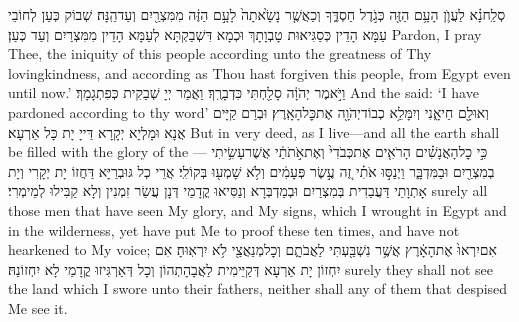 {סְלַֽח\maqqaf נָ֗א לַעֲוֺ֛ן הָעָ֥ם הַזֶּ֖ה כְּגֹ֣דֶל חַסְדֶּ֑ךָ וְכַאֲשֶׁ֤ר נָשָׂ֙אתָה֙ לָעָ֣ם הַזֶּ֔ה מִמִּצְרַ֖יִם וְעַד\maqqaf הֵֽנָּה׃}
{שְׁבוֹק כְּעַן לְחוֹבֵי עַמָּא הָדֵין כְּסַגִּיאוּת טָבְוָתָךְ וּכְמָא דִּשְׁבַקְתָּא לְעַמָּא הָדֵין מִמִּצְרַיִם וְעַד כְּעַן׃}
{Pardon, I pray Thee, the iniquity of this people according unto the greatness of Thy lovingkindness, and according as Thou hast forgiven this people, from Egypt even until now.’}{}
{וַיֹּ֣אמֶר יְהֹוָ֔ה סָלַ֖חְתִּי כִּדְבָרֶֽךָ׃}
{וַאֲמַר יְיָ שְׁבַקִית כְּפִתְגָמָךְ׃}
{And the \lord\space said: ‘I have pardoned according to thy word’}{}
{וְאוּלָ֖ם חַי\maqqaf אָ֑נִי וְיִמָּלֵ֥א כְבוֹד\maqqaf יְהֹוָ֖ה אֶת\maqqaf כׇּל\maqqaf הָאָֽרֶץ׃}
{וּבְרַם קַיָּים אֲנָא וּמָלְיָא יְקָרָא דַּייָ יָת כָּל אַרְעָא׃}
{But in very deed, as I live—and all the earth shall be filled with the glory of the \lord—}{}
{כִּ֣י כׇל\maqqaf הָאֲנָשִׁ֗ים הָרֹאִ֤ים אֶת\maqqaf כְּבֹדִי֙ וְאֶת\maqqaf אֹ֣תֹתַ֔י אֲשֶׁר\maqqaf עָשִׂ֥יתִי בְמִצְרַ֖יִם וּבַמִּדְבָּ֑ר וַיְנַסּ֣וּ אֹתִ֗י זֶ֚ה עֶ֣שֶׂר פְּעָמִ֔ים וְלֹ֥א שָׁמְע֖וּ בְּקוֹלִֽי׃}
{אֲרֵי כְל גּוּבְרַיָּא דַּחֲזוֹ יָת יְקָרִי וְיָת אָתְוָתַי דַּעֲבַדִית בְּמִצְרַיִם וּבְמַדְבְּרָא וְנַסִּיאוּ קֳדָמַי דְּנָן עֲשַׂר זִמְנִין וְלָא קַבִּילוּ לְמֵימְרִי׃}
{surely all those men that have seen My glory, and My signs, which I wrought in Egypt and in the wilderness, yet have put Me to proof these ten times, and have not hearkened to My voice;}{}
{אִם\maqqaf יִרְאוּ֙ אֶת\maqqaf הָאָ֔רֶץ אֲשֶׁ֥ר נִשְׁבַּ֖עְתִּי לַאֲבֹתָ֑ם וְכׇל\maqqaf מְנַאֲצַ֖י לֹ֥א יִרְאֽוּהָ׃}
{אִם יִחְזוֹן יָת אַרְעָא דְּקַיֵּימִית לַאֲבָהָתְהוֹן וְכָל דְּאַרְגִּיזוּ קֳדָמַי לָא יִחְזוֹנַהּ׃}
{surely they shall not see the land which I swore unto their fathers, neither shall any of them that despised Me see it.}{}
